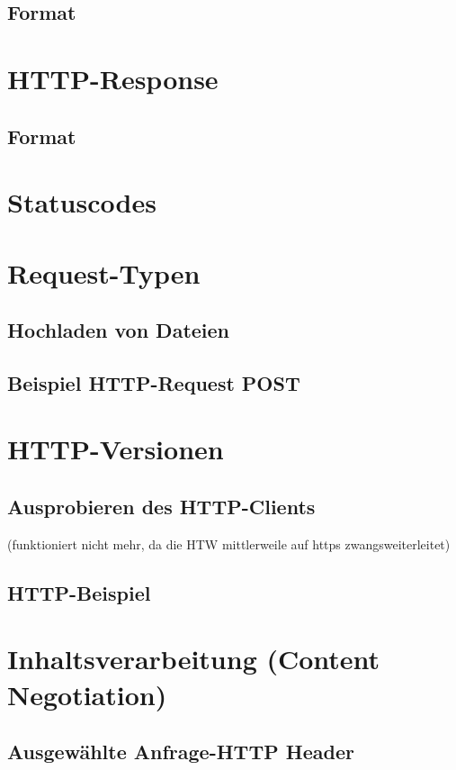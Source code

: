 \subsection*{Format}
\section{HTTP-Response}
\subsection*{Format}
\section{Statuscodes}
\section{Request-Typen}
\subsection{Hochladen von Dateien}
\subsection{Beispiel HTTP-Request POST}
\section{HTTP-Versionen}
\subsection*{Ausprobieren des HTTP-Clients}
(funktioniert nicht mehr, da die HTW mittlerweile auf https zwangsweiterleitet)
\subsection*{HTTP-Beispiel}
\section{Inhaltsverarbeitung (Content Negotiation)}
\subsection{Ausgewählte Anfrage-HTTP Header}
